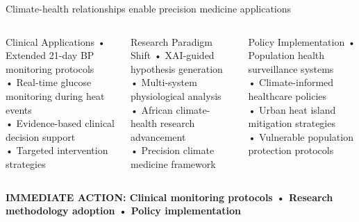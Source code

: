 \documentclass[10pt,aspectratio=169]{beamer}
\begin{document}
\begin{frame}{Climate-health relationships enable precision medicine applications}
\begin{columns}[T]
\begin{block}{Clinical Applications}
• Extended 21-day BP monitoring protocols \\
• Real-time glucose monitoring during heat events \\
• Evidence-based clinical decision support \\
• Targeted intervention strategies
\end{block}

\begin{block}{Research Paradigm Shift}
• XAI-guided hypothesis generation \\
• Multi-system physiological analysis \\
• African climate-health research advancement \\
• Precision climate medicine framework
\end{block}

\begin{block}{Policy Implementation}
• Population health surveillance systems \\
• Climate-informed healthcare policies \\
• Urban heat island mitigation strategies \\
• Vulnerable population protection protocols
\end{block}
\end{columns}

\vspace{0.8cm}
\begin{center}
\textcolor{accentorange}{\textbf{IMMEDIATE ACTION: Clinical monitoring protocols • Research methodology adoption • Policy implementation}}
\end{center}
\end{frame}
\end{document}
